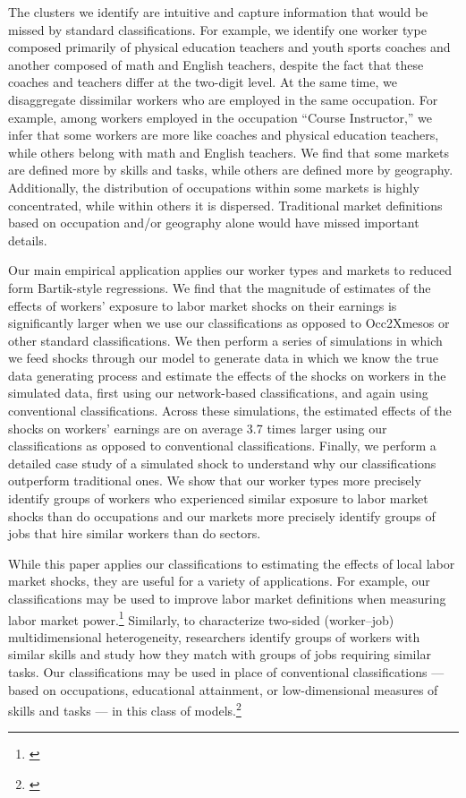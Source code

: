 \documentclass[12pt]{article}
\theoremstyle{definition}
\theoremstyle{plain}
\begin{document}
The clusters we identify are intuitive and capture information that would be missed by standard classifications. For example, we identify one worker type composed primarily of physical education teachers and youth sports coaches and another composed of math and English teachers, despite the fact that these coaches and teachers differ at the two-digit level. At the same time, we disaggregate dissimilar workers who are employed in the same occupation. For example, among workers employed in the occupation “Course Instructor,” we infer that some workers are more like coaches and physical education teachers, while others belong with math and English teachers. We find that some markets are defined more by skills and tasks, while others are defined more by geography. Additionally, the distribution of occupations within some markets is highly concentrated, while within others it is dispersed. Traditional market definitions based on occupation and/or geography alone would have missed important details. 


Our main empirical application applies our worker types and markets to reduced form Bartik-style regressions.  We find that the magnitude of estimates of the effects of workers' exposure to labor market shocks on their earnings is significantly larger when we use our classifications as opposed to Occ2Xmesos or other standard classifications. We then perform a series of simulations in which we feed shocks through our model to generate data in which we know the true data generating process and estimate the effects of the shocks on workers in the simulated data, first using our network-based classifications, and again using conventional classifications. Across these simulations, the estimated effects of the shocks on workers' earnings are on average 3.7 times larger using our classifications as opposed to conventional classifications. Finally, we perform a detailed case study of a simulated shock to understand why our classifications outperform traditional ones. We show that our worker types more precisely identify groups of workers who experienced similar exposure to labor market shocks than do occupations and our markets more precisely identify groups of jobs that hire similar workers than do sectors. 

While this paper applies our classifications to estimating the effects of local labor market shocks, they are useful for a variety of applications. For example, our classifications may be used to improve labor market definitions when measuring labor market power.\footnote{\citet{BergerHerkenhoffMongey2022,Felix2021,AzarMarinescuSteinbaumTaska2018,BenmelechBergmanKim2018,Rinz2018,AzarMarinescuSteinbaum2019,SchubertStansburyTaska2020,Arnold2020,Lipsius2018,JaroschNimczikSorkin2019}} Similarly,  to characterize two-sided (worker--job) multidimensional heterogeneity, researchers identify groups of workers with similar skills and study how they match with groups of jobs requiring similar tasks. Our classifications may be used in place of conventional classifications --- based on occupations, educational attainment, or low-dimensional measures of skills and tasks --- in this class of models.\footnote{\citet{AutorLevyMurnane2003,AcemogluAutor2011,Autor2013,Tan2018,Lindenlaub2017,Kantenga2018}} 
\end{document}
